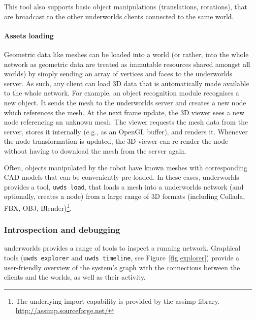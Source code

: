 \documentclass[conference]{IEEEtran}
\newcommand{\eg}{e.g.,\xspace}
\newcommand{\uwds}{{\sc underworlds}\xspace}
\begin{document}
This tool also supports basic object manipulations (translations, rotations),
that are broadcast to the other \uwds clients connected to the same world.

\paragraph*{Assets loading}

Geometric data like meshes can be loaded into a world (or rather, into the whole
network as geometric data are treated as immutable resources shared amongst all
worlds) by simply sending an array of vertices and faces to the \uwds server.
As such, any client can load 3D data that is automatically made available to the
whole network. For example, an object recognition module recognises a new
object. It sends the mesh to the \uwds server and creates a new node which
references the mesh. At the next frame update, the 3D viewer sees a new node
referencing an unknown mesh. The viewer requests the mesh data from the
server, stores it internally (\eg as an OpenGL buffer), and renders it. Whenever
the node transformation is updated, the 3D viewer can re-render the node without
having to download the mesh from the server again.

Often, objects manipulated by the robot have known meshes with corresponding CAD
models that can be conveniently pre-loaded. In these cases, \uwds provides a
tool, {\tt uwds load}, that loads a mesh into a \uwds network (and optionally,
creates a node) from a large range of 3D formats (including Collada, FBX, OBJ,
Blender)\footnote{The underlying import
capability is provided by the {\sc assimp} library.
\url{http://assimp.sourceforge.net/}}.

\subsubsection{Introspection and debugging}

\uwds provides a range of tools to inspect a running network. Graphical
tools ({\tt uwds explorer} and {\tt uwds timeline}, see Figure~\ref{fig|explorer})
provide a user-friendly overview of the system's graph with the connections
between the clients and the worlds, as well as their activity.
\end{document}
